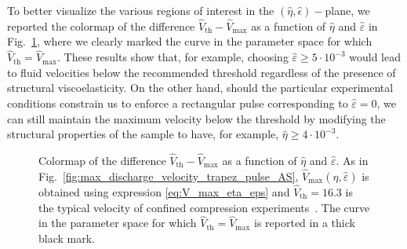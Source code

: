 \documentclass[12pt,a4paper]{amsart}
\theoremstyle{definition}
\begin{document}
To better visualize the various regions of interest in the $(\hat{\eta},\hat{\epsilon}) -$plane, we reported  the colormap of the difference $ \hat{V}_{\text{th}}-\hat{V}_{\max }$ as a function of $\hat{\eta}$ and $\hat{\varepsilon}$ in Fig.~\ref{fig:vth-vmax}, where we clearly marked the curve in the parameter space for which $ \hat{V}_{\text{th}}=\hat{V}_{\max }$. These results show that, for example, choosing $\hat{\varepsilon} \geq 5 \cdot 10^{-3}$ would lead to fluid velocities below the recommended threshold regardless of the presence of structural viscoelasticity. On the other hand, should
the particular experimental conditions constrain us to enforce a rectangular pulse corresponding to $\hat{\varepsilon}=0$, we can still maintain the maximum velocity below the threshold by modifying the structural properties of the sample to have, for example, $\hat{\eta}\geq4\cdot 10^{-3}$.


\begin{figure}[h!]
\begin{center}
\end{center}
\caption{Colormap of the difference $ \hat{V}_{\text{th}}-\hat{V}_{\max }$ as a function of $\hat{\eta}$ and $\hat{\varepsilon}$. As in Fig.~\ref{fig:max_discharge_velocity_trapez_pulse_AS}, $\hat{V}_{\max}(\hat{\eta},\hat{\varepsilon})$ is obtained  using expression \eqref{eq:V_max_eta_eps} and $\hat{V}_{\text{th}} = 16.3$ is the typical velocity of confined compression experiments~\cite{Soltz1998}.
The curve in the parameter space for which $ \hat{V}_{\text{th}}=\hat{V}_{\max }$ is reported in a thick black mark.}
\label{fig:vth-vmax}
\end{figure}
\end{document}
